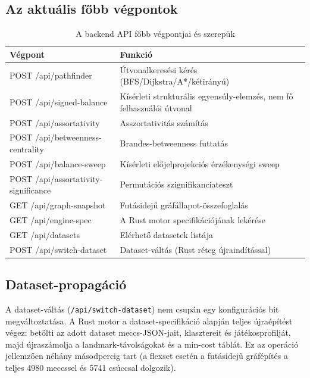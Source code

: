 ﻿\documentclass[a4paper,12pt]{report}
\begin{document}
\subsection{Az aktuális főbb végpontok}

\begin{table}[H]
\centering
\caption{A backend API főbb végpontjai és szerepük}
\small
\begin{tabularx}{\textwidth}{>{\ttfamily\raggedright\arraybackslash}p{5.5cm} >{\raggedright\arraybackslash}X}
\toprule
\textbf{Végpont} & \textbf{Funkció} \\
\midrule
POST /api/pathfinder & Útvonalkeresési kérés (BFS/Dijkstra/A*/kétirányú) \\
POST /api/signed-balance & Kísérleti strukturális egyensúly-elemzés, nem fő felhasználói útvonal \\
POST /api/assortativity & Asszortativitás számítás \\
POST /api/betweenness-centrality & Brandes-betweenness futtatás \\
POST /api/balance-sweep & Kísérleti előjelprojekciós érzékenységi sweep \\
POST /api/assortativity-significance & Permutációs szignifikanciateszt \\
GET /api/graph-snapshot & Futásidejű gráfállapot-összefoglalás \\
GET /api/engine-spec & A Rust motor specifikációjának lekérése \\
GET /api/datasets & Elérhető datasetek listája \\
POST /api/switch-dataset & Dataset-váltás (Rust réteg újraindítással) \\
\bottomrule
\end{tabularx}
\normalsize
\end{table}

\subsection{Dataset-propagáció}

A dataset-váltás (\texttt{/api/switch-dataset}) nem csupán egy konfigurációs bit megváltoztatása. A Rust motor a dataset-specifikáció alapján teljes újraépítést végez: betölti az adott dataset meccs-JSON-jait, klasztereit és játékosprofilját, majd újraszámolja a landmark-távolságokat és a min-cost táblát. Ez az operáció jellemzően néhány másodpercig tart (a flexset esetén a futásidejű gráfépítés a teljes 4980 meccssel és 5741 csúccsal dolgozik).
\end{document}

